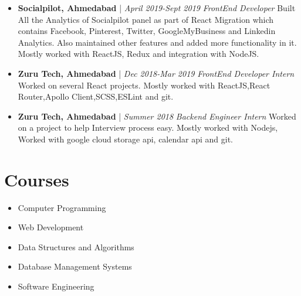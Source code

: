 \documentclass[11pt,a4paper,sans]{moderncv}        %
\begin{document}
\begin{itemize}
\item \textbf{Socialpilot, Ahmedabad} | \textit{April 2019-Sept 2019} \vspace{3pt}\newline
\textit{FrontEnd Developer} \newline
\small{Built All the Analytics of Socialpilot panel as part of React Migration which contains Facebook, Pinterest, Twitter, GoogleMyBusiness and Linkedin Analytics. Also maintained other features and added more functionality in it.} \newline
\small{Mostly worked with ReactJS, Redux and integration with NodeJS.} \vspace{6pt}
\end{itemize}

\begin{itemize}
\item \textbf{Zuru Tech, Ahmedabad} | \textit{Dec 2018-Mar 2019} \vspace{3pt}\newline
\textit{FrontEnd Developer Intern} \newline
\small{Worked on several React projects.} \newline
\small{Mostly worked with ReactJS,React Router,Apollo Client,SCSS,ESLint and git.} \vspace{6pt}
\end{itemize}

\begin{itemize}
\item \textbf{Zuru Tech, Ahmedabad} | \textit{Summer 2018} \vspace{3pt}\newline
\textit{Backend Engineer Intern} \newline
\small{Worked on a project to help Interview process easy.} \newline
\small{Mostly worked with Nodejs, Worked with google cloud storage api, calendar api and git.} \vspace{6pt}
\end{itemize}

\section{Courses}
\vspace{6pt}
\begin{itemize}
\item Computer Programming\vspace{4pt}
\item Web Development\vspace{4pt}
\item Data Structures and Algorithms \vspace{4pt}
\item Database Management Systems\vspace{4pt}
\item Software Engineering\vspace{4pt}
\end{itemize}
 		
\end{document}
